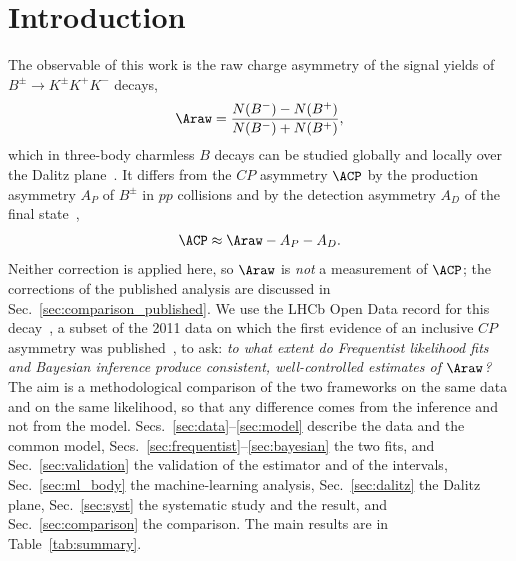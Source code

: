 \section{Introduction}
\label{sec:intro}
The observable of this work is the raw charge asymmetry of the signal yields of $B^{\pm}\to K^{\pm}K^{+}K^{-}$ decays,
\begin{equation}
\Araw=\frac{N(B^-)-N(B^+)}{N(B^-)+N(B^+)} ,
\label{eq:araw}
\end{equation}
which in three-body charmless $B$ decays can be studied globally and locally over the Dalitz plane~\cite{lhcb_cpv_prd2023,lhcb_cpv_paper}. It differs from the $CP$ asymmetry $\ACP$ by the production asymmetry $A_P$ of $B^\pm$ in $pp$ collisions and by the detection asymmetry $A_D$ of the final state~\cite{lhcb_cpv_prd2023},
\begin{equation}
\ACP\approx\Araw-A_P-A_D .
\label{eq:acp}
\end{equation}
Neither correction is applied here, so $\Araw$ is \emph{not} a measurement of $\ACP$; the corrections of the published analysis are discussed in Sec.~\ref{sec:comparison_published}.
We use the LHCb Open Data record for this decay~\cite{opendata_record,opendata_notebook}, a subset of the 2011 data on which the first evidence of an inclusive $CP$ asymmetry was published~\cite{lhcb_cpv_2013}, to ask: \emph{to what extent do Frequentist likelihood fits and Bayesian inference produce consistent, well-controlled estimates of $\Araw$?} The aim is a methodological comparison of the two frameworks on the same data and on the same likelihood, so that any difference comes from the inference and not from the model. Secs.~\ref{sec:data}--\ref{sec:model} describe the data and the common model, Secs.~\ref{sec:frequentist}--\ref{sec:bayesian} the two fits, and Sec.~\ref{sec:validation} the validation of the estimator and of the intervals, Sec.~\ref{sec:ml_body} the machine-learning analysis, Sec.~\ref{sec:dalitz} the Dalitz plane, Sec.~\ref{sec:syst} the systematic study and the result, and Sec.~\ref{sec:comparison} the comparison. The main results are in Table~\ref{tab:summary}.


